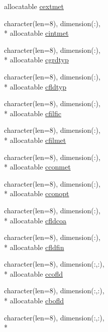 \begin{DoxyCompactItemize}
allocatable \hyperlink{classmod__oasis__namcouple_a1066d92e6c9301bdb46ddda7edd7d29a}{cextmet}
\item 
character(len=8), dimension(\+:), \\*
allocatable \hyperlink{classmod__oasis__namcouple_ac9b9bb442cf77881bef2157c85e23495}{cintmet}
\item 
character(len=8), dimension(\+:), \\*
allocatable \hyperlink{classmod__oasis__namcouple_a795db0909c85ffadb601b744b5189ff5}{cgrdtyp}
\item 
character(len=8), dimension(\+:), \\*
allocatable \hyperlink{classmod__oasis__namcouple_ab139e7bad0413c79a5ad8e0837d3e0ef}{cfldtyp}
\item 
character(len=8), dimension(\+:), \\*
allocatable \hyperlink{classmod__oasis__namcouple_a6a69d927924d3fa391fdc3ec6cb78197}{cfilfic}
\item 
character(len=8), dimension(\+:), \\*
allocatable \hyperlink{classmod__oasis__namcouple_adf402f22f61893178fadcefe43b91102}{cfilmet}
\item 
character(len=8), dimension(\+:), \\*
allocatable \hyperlink{classmod__oasis__namcouple_a535fadd17426c228698e3a51fd54b605}{cconmet}
\item 
character(len=8), dimension(\+:), \\*
allocatable \hyperlink{classmod__oasis__namcouple_a240979dfe7369da899b0cfe2aeba4f9d}{cconopt}
\item 
character(len=8), dimension(\+:), \\*
allocatable \hyperlink{classmod__oasis__namcouple_af3a308fee2e4b00a1380035e41113d36}{cfldcoa}
\item 
character(len=8), dimension(\+:), \\*
allocatable \hyperlink{classmod__oasis__namcouple_aa387fcfde8c2538e22897b243ff5024c}{cfldfin}
\item 
character(len=8), dimension(\+:,\+:), \\*
allocatable \hyperlink{classmod__oasis__namcouple_af8d81a53bd28ddf6bfe19f5e05f1d867}{ccofld}
\item 
character(len=8), dimension(\+:,\+:), \\*
allocatable \hyperlink{classmod__oasis__namcouple_ab0f93bb917e445dc4e55fc2326168a42}{cbofld}
\item 
character(len=8), dimension(\+:,\+:), \\*

\end{DoxyCompactItemize}
